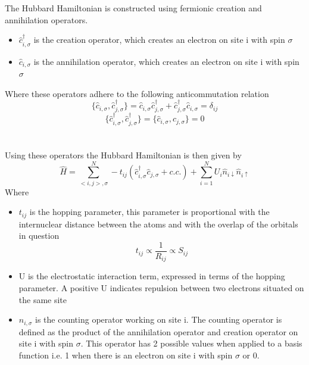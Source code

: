 \documentclass[]{article}
\begin{document}
The Hubbard Hamiltonian is constructed using fermionic creation and annihilation operators.
\begin{itemize}
	\item $\hat{c}^{\dagger}_{i, \sigma}$ is the creation operator, which creates an electron on site i with spin $\sigma$ 
	\item $\hat{c}_{i, \sigma}$ is the annihilation operator, which creates an electron on site i with spin $\sigma$ 	
\end{itemize}
Where these operators adhere to the following anticommutation relation
\begin{equation*}
	\{ \hat{c}_{i,\sigma}, \hat{c}_{j,\sigma}^{\dagger} \} = \hat{c}_{i,\sigma}\hat{c}_{j,\sigma}^{\dagger}+\hat{c}_{j,\sigma}^{\dagger}\hat{c}_{i,\sigma} = \delta_{ij}
\end{equation*}
\begin{equation*}
\{ \hat{c}_{i,\sigma}^{\dagger}, \hat{c}_{j,\sigma}^{\dagger} \} =\{ \hat{c}_{i,\sigma}, \hat{c}_{j,\sigma} \}=0 
\end{equation*}
\\
\\
Using these operators the Hubbard Hamiltonian is then given by
\begin{equation*}
\hat{H} = \sum_{<i,j>,\sigma}^{N}-t_{ij}\left (\hat{c}_{i,\sigma}^{\dagger} \hat{c}_{j,\sigma} + c.c.\right) + \sum_{i=1}^{N}U_i \hat{n}_{i\downarrow}\hat{n}_{i\uparrow}
\end{equation*}
Where
\begin{itemize}
	\item $t_{ij}$ is the hopping parameter, this parameter is proportional with the internuclear distance between the atoms and with the overlap of the orbitals in question
	\begin{equation*}
		t_{ij} \propto \frac{1}{R_{ij}} \propto S_{ij}  
	\end{equation*}
	\item U is the electrostatic interaction term, expressed in terms of the hopping parameter. A positive U indicates repulsion between two electrons situated on the same site
	\item $\hat{n}_{i,\sigma}$ is the counting operator working on site i. The counting operator is defined as the product of the annihilation operator and creation operator on site i with spin $\sigma$. This operator has 2 possible values when applied to a basis function i.e. 1 when there is an electron on site i with spin $\sigma$ or 0. 
\end{itemize}
\end{document}
